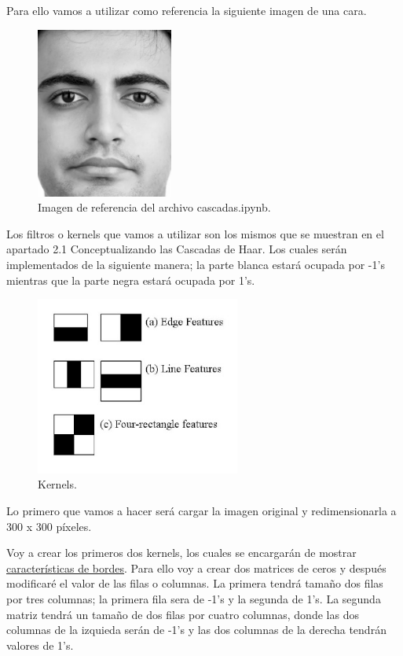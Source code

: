 \documentclass[a4paper]{article}
\begin{document}
Para ello vamos a utilizar como referencia la siguiente imagen de una cara.

\begin{figure}[H]
    \centering
    \includegraphics[width=0.40\textwidth]{../img/cara.png}
    \caption{Imagen de referencia del archivo cascadas.ipynb.}
\end{figure}

Los filtros o kernels que vamos a utilizar son los mismos que se muestran en el apartado 2.1 Conceptualizando las Cascadas de Haar.
Los cuales serán implementados de la siguiente manera; la parte blanca estará ocupada por -1's mientras que la parte negra estará ocupada por 1's.

\begin{figure}[H]
    \centering
    \includegraphics[width=0.6\textwidth]{../img/haar_feat.png}
    \caption{Kernels.}
\end{figure}

Lo primero que vamos a hacer será cargar la imagen original y redimensionarla a 300 x 300 píxeles.

Voy a crear los primeros dos kernels, los cuales se encargarán de mostrar \underline{características de bordes}.
Para ello voy a crear dos matrices de ceros y después modificaré el valor de las filas o columnas. La primera tendrá tamaño dos filas por tres columnas; la primera fila sera de -1's y la segunda de 1's.
La segunda matriz tendrá un tamaño de dos filas por cuatro columnas, donde las dos columnas de la izquieda serán de -1's y las dos columnas de la derecha tendrán valores de 1's.
\end{document}
